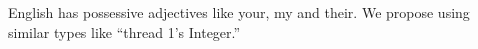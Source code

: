 
English has possessive adjectives like your, my and their.
We propose using similar types like ``thread 1's Integer.''
